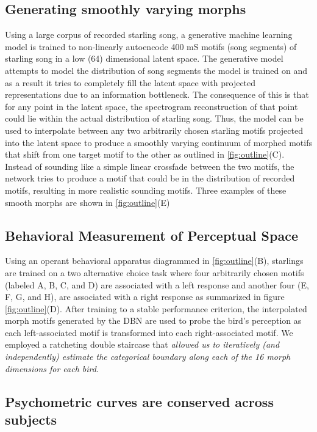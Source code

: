 

\subsection{Generating smoothly varying morphs}

Using a large corpus of recorded starling song, a generative machine learning model is trained to non-linearly autoencode 400 mS motifs (song segments) of starling song in a low (64) dimensional latent space. The generative model attempts to model the distribution of song segments the model is trained on and as a result it tries to completely fill the latent space with projected representations due to an information bottleneck. The consequence of this is that for any point in the latent space, the spectrogram reconstruction of that point could lie within the actual distribution of starling song. Thus, the model can be used to interpolate between any two arbitrarily chosen starling motifs projected into the latent space to produce a smoothly varying continuum of morphed motifs that shift from one target motif to the other as outlined in \ref{fig:outline}(C). Instead of sounding like a simple linear crossfade between the two motifs, the network tries to produce a motif that could be in the distribution of recorded motifs, resulting in more realistic sounding motifs. Three examples of these smooth morphs are shown in \ref{fig:outline}(E) 

\subsection{Behavioral Measurement of Perceptual Space}

Using an operant behavioral apparatus diagrammed in \ref{fig:outline}(B), starlings are trained on a two alternative choice task where four arbitrarily chosen motifs (labeled A, B, C, and D) are associated with a left response and another four (E, F, G, and H), are associated with a right response as summarized in figure \ref{fig:outline}(D). After training to a stable performance criterion, the interpolated morph motifs generated by the \ac{DBN} are used to probe the bird's perception as each left-associated motif is transformed into each right-associated motif. We employed a ratcheting double staircase that \emph{allowed us to iteratively (and independently) estimate the categorical boundary along each of the 16 morph dimensions for each bird}. 

\subsection{Psychometric curves are conserved across subjects}

